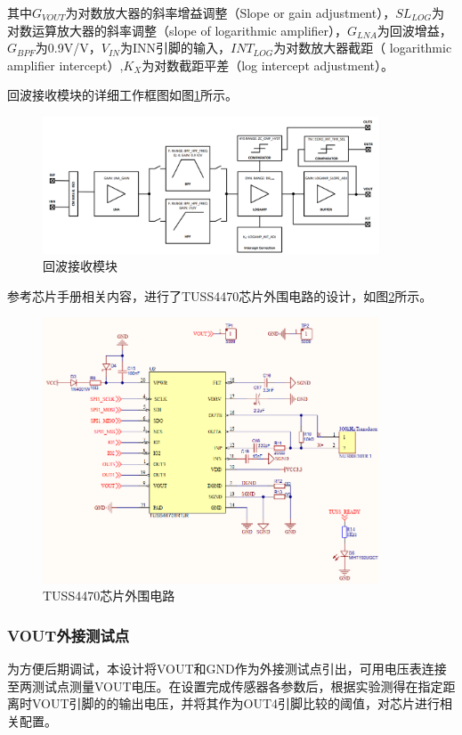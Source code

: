         其中$G_{VOUT}$为对数放大器的斜率增益调整（Slope or gain adjustment），$SL_{LOG}$为对数运算放大器的斜率调整（slope of logarithmic amplifier），$G_{LNA}$为回波增益，$G_{BPF}$为0.9V/V，$V_{IN}$为INN引脚的输入，$INT_{LOG}$为对数放大器截距（ logarithmic amplifier intercept）,$K_X$为对数截距平差（log intercept adjustment）。\par
    回波接收模块的详细工作框图如图\ref{回波接收模块}所示。
    \begin{figure}[ht]
        \centering
        \includegraphics[width=10cm]{figure/Analog Front-End Block Diagram.png}
        \caption{回波接收模块}
        \label{回波接收模块}
    \end{figure}\par

    参考芯片手册相关内容，进行了TUSS4470芯片外围电路的设计，如图\ref{TUSS4470芯片外围电路}所示。
    \begin{figure}[ht]
        \centering
        \includegraphics[width=10cm]{figure/TUSS4470 peripheral circuit.png}
        \caption{TUSS4470芯片外围电路}
        \label{TUSS4470芯片外围电路}
    \end{figure}
    \subsubsection{VOUT外接测试点}
    为方便后期调试，本设计将VOUT和GND作为外接测试点引出，可用电压表连接至两测试点测量VOUT电压。在设置完成传感器各参数后，根据实验测得在指定距离时VOUT引脚的的输出电压，并将其作为OUT4引脚比较的阈值，对芯片进行相关配置。

